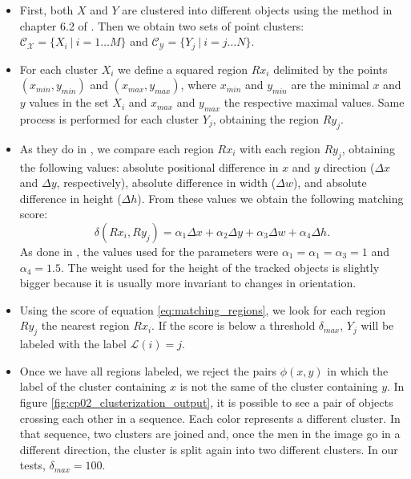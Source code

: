\begin{itemize}
 \item First, both $X$ and $Y$ are clustered into different objects using the method in chapter 6.2 of 
\cite{rusu2009semantic}. Then we obtain two sets of point clusters: $\mathcal{C_X} = \{ X_i ~|~ i=1 \dots M \}$ 
and $\mathcal{C_Y} = \{ Y_j ~|~ i=j \dots N \}$.
 \item For each cluster $X_i$ we define a squared region $Rx_i$ delimited by the points $(x_{min}, y_{min})$ and $(x_{max}, y_{max})$, where $x_{min}$ and $y_{min}$ are the minimal $x$ and $y$ values in the set $X_i$ and $x_{max}$ and $y_{max}$ the respective maximal values. Same process is performed for each cluster $Y_j$, obtaining the region $Ry_j$.
 \item As they do in \cite{siebel2003design}, we compare each region $Rx_i$ with each region $Ry_j$, obtaining the following values: absolute positional difference in $x$ and $y$ direction ($\varDelta x$ and $\varDelta y$, respectively), absolute difference in width ($\varDelta w$), and absolute difference in height ($\varDelta h$). From these values we obtain the following matching score:
 \begin{equation}\label{eq:matching_regions}
  \delta (Rx_i, Ry_j) = \alpha_1 \varDelta x + \alpha_2 \varDelta y + \alpha_3 \varDelta w + \alpha_4 \varDelta h.
 \end{equation}
 As done in \cite{siebel2003design}, the values used for the parameters were $\alpha_1 = \alpha_1 = \alpha_3 = 1$ and $\alpha_4 = 1.5$. The weight used for the height of the tracked objects is slightly bigger because it is usually more invariant to changes in orientation.
 \item Using the score of equation \ref{eq:matching_regions}, we look for each region $Ry_j$ the nearest region $Rx_i$. 
If the score is below a threshold $\delta_{max}$, $Y_j$ will be labeled with the label $\mathcal{L}(i) = j$.
 \item Once we have all regions labeled, we reject the pairs $\phi(x,y)$ in which the label of the cluster containing 
$x$ is not the same of the cluster containing $y$. In figure \ref{fig:cp02_clusterization_output}, it is possible to see a 
pair of objects crossing each other in a sequence. Each color represents a different cluster. In that sequence, two 
clusters are joined and, once the men in the image go in a different direction, the cluster is split again into two 
different clusters. In our tests, $\delta_{max} = 100$.
\end{itemize}

